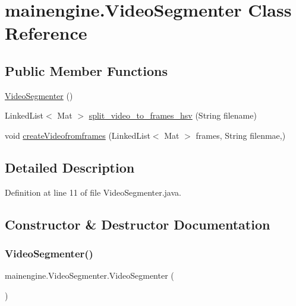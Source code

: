 \hypertarget{classmainengine_1_1_video_segmenter}{}\section{mainengine.\+Video\+Segmenter Class Reference}
\label{classmainengine_1_1_video_segmenter}
\subsection*{Public Member Functions}
\begin{DoxyCompactItemize}
\item 
\hyperlink{classmainengine_1_1_video_segmenter_a2901ca72cf0d9a0e5c3fe7d5a49cbf05}{Video\+Segmenter} ()
\item 
Linked\+List$<$ Mat $>$ \hyperlink{classmainengine_1_1_video_segmenter_ae3e987f60b12c66b3c212646f4a1f9f5}{split\+\_\+video\+\_\+to\+\_\+frames\+\_\+hsv} (String filename)
\item 
void \hyperlink{classmainengine_1_1_video_segmenter_a73f78b10d93a3fe04285a69875b50d01}{create\+Videofromframes} (Linked\+List$<$ Mat $>$ frames, String filenmae,)
\end{DoxyCompactItemize}


\subsection{Detailed Description}


Definition at line 11 of file Video\+Segmenter.\+java.



\subsection{Constructor \& Destructor Documentation}
\hypertarget{classmainengine_1_1_video_segmenter_a2901ca72cf0d9a0e5c3fe7d5a49cbf05}{}\label{classmainengine_1_1_video_segmenter_a2901ca72cf0d9a0e5c3fe7d5a49cbf05} 
\subsubsection{\texorpdfstring{Video\+Segmenter()}{VideoSegmenter()}}
{\footnotesize\ttfamily mainengine.\+Video\+Segmenter.\+Video\+Segmenter (\begin{DoxyParamCaption}{ }\end{DoxyParamCaption})}



